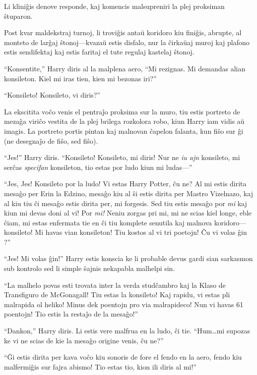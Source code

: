 Li kliniĝis denove responde, kaj komencis malsupreniri la plej
proksiman ŝtuparon.

Post kvar maldekstraj turnoj, li troviĝis antaŭ koridoro kiu finiĝis, abrupte, al
monteto de larĝaj ŝtonoj—kvazaŭ estis disfalo, nur la ĉirkaŭaj muroj kaj plafono
estis sendifektaj kaj estis faritaj el tute regulaj kastelaj ŝtonoj.

``Konsentite,'' Harry diris al la malplena aero, ``Mi rezignas. Mi
demandas alian konsileton. Kiel mi iras tien, kien mi bezonas iri?''

``Konsileto! Konsileto, vi diris?''

La ekscitita voĉo venis el pentraĵo proksima sur la muro, tiu estis portreto de
mezaĝa viriĉo vestita de la plej brilega rozkolora robo, kiun Harry iam vidis aŭ
imagis. La portreto portis pintan kaj malnovan ĉapelon falanta, kun fiŝo sur ĝi
(ne desegnaĵo de fiŝo, sed fiŝo).

``Jes!'' Harry diris. ``Konsileto! Konsileto, mi diris! Nur ne \emph{iu ajn}
konsileto, mi serĉas \emph{specifan} konsileton, tio estas por ludo kiun mi
ludas—''

``Jes, Jes! Konsileto por la ludo! Vi estas Harry Potter, ĉu ne? Al mi estis
dirita mesaĝo per Erin la Edzino, mesaĝo kiu al ŝi estis dirita per Mastro
Vizelnazo, kaj al kiu tiu ĉi mesaĝo estis dirita per, mi forgesis. Sed tiu estis
mesaĝo por \emph{mi} kaj kiun mi devas doni al vi! Por \emph{mi!} Neniu zorgas
pri mi, mi ne scias kiel longe, eble ĉiam, mi estas enfermata tie en ĉi tiu
komplete senutila kaj malnova koridoro—konsileto! Mi havas vian konsileton! Tiu
kostos al vi tri poetojn! Ĉu vi volas ĝin ?''

``Jes! Mi volas ĝin!'' Harry estis konscia ke li probable devus gardi
sian sarkasmon sub kontrolo sed li simple ŝajnis nekapabla malhelpi
sin.

``La malhelo povas esti trovata inter la verda studĉambro kaj la Klaso de
Transfiguro de McGonagall! Tiu estas la konsileto! Kaj rapidu, vi estas pli
malrapida ol heliko! Minus dek poentojn pro via malrapideco! Nun vi havas 61
poentojn! Tio estis la restaĵo de la mesaĝo!''

``Dankon,'' Harry diris. Li estis vere malfrua en la ludo, ĉi
tie. ``Hum\ldots mi supozas ke vi ne scias de kie la mesaĝo origine
venis, ĉu ne?'' 

``Ĝi estis dirita per kava voĉo kiu sonoris de fore el fendo en la aero, fendo
kiu malfermiĝis sur fajra abismo! Tio estas tio, kion ili diris al mi!''

